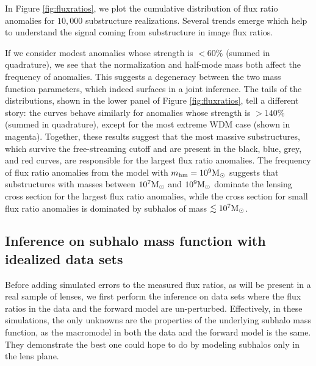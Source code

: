 In Figure \ref{fig:fluxratios}, we plot the cumulative distribution of flux ratio anomalies for $10,000$ substructure realizations. Several trends emerge which help to understand the signal coming from substructure in image flux ratios.

If we consider modest anomalies whose strength is $<60\%$ (summed in quadrature), we see that the normalization and half-mode mass both affect the frequency of anomalies. This suggests a degeneracy between the two mass function parameters, which indeed surfaces in a joint inference. The tails of the distributions, shown in the lower panel of Figure \ref{fig:fluxratios}, tell a different story: the curves behave similarly for anomalies whose strength is $>140\%$ (summed in quadrature), except for the most extreme WDM case (shown in magenta).  Together, these results suggest that the most massive substructures, which survive the free-streaming cutoff and are present in the black, blue, grey, and red curves, are responsible for the largest flux ratio anomalies. The frequency of flux ratio anomalies from the model with $m_{\rm{hm}}=10^9{\rm{M}_{\odot}}$ suggests that substructures with masses between $10^7 {\rm{M}_{\odot}}$ and $10^9 {\rm{M}_{\odot}}$ dominate the lensing cross section for the largest flux ratio anomalies, while the cross section for small flux ratio anomalies is dominated by subhalos of mass $\lesssim 10^7 {\rm{M}_{\odot}}$.

\subsection{Inference on subhalo mass function with idealized data sets}
\label{ssec:idealized_inf}

Before adding simulated errors to the measured flux ratios, as will be present in a real sample of lenses, we first perform the inference on data sets where the flux ratios in the data and the forward model are un-perturbed. Effectively, in these simulations, the only unknowns are the properties of the underlying subhalo mass function, as the macromodel in both the data and the forward model is the same. They demonstrate the best one could hope to do by modeling subhalos only in the lens plane. 

